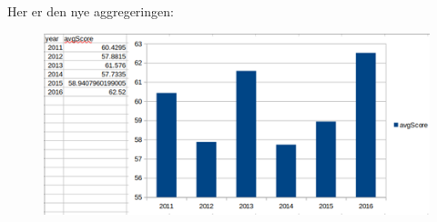 Her er den nye aggregeringen:

\FigureCounter
\begin{figure}[H]
    \includegraphics[width=\textwidth]{images/milepael5/avgScoreTotStudentsActual.png}
\end{figure}

